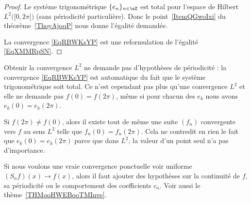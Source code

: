 \begin{proof}
    Le système trigonométrique \( \{ e_n \}_{n\in \eZ}\) est total pour l'espace de Hilbert \( L^2\big( \mathopen[ 0 , 2\pi \mathclose] \big)\) (sans périodicité particulière). Donc le point~\ref{ItemQGwoIxi} du théorème~\ref{ThoyAjoqP} nous donne l'égalité demandée.

    La convergence \eqref{EqRBWKsYP} est une reformulation de l'égalité \eqref{EqXMMRpSN}.
\end{proof}

\begin{normaltext}
    Obtenir la convergence \( L^2\) ne demande pas d'hypothèses de périodicité : la convergence \eqref{EqRBWKsYP} est automatique du fait que le système trigonométrique soit total. Ce n'est cependant pas plus qu'une convergence \( L^2\) et elle ne demande pas \( f(0)=f(2\pi)\), même si pour chacun des \( e_k\) nous avons \( e_k(0)=e_k(2\pi)\).

    Si \( f(2\pi)\neq f(0)\), alors il existe tout de même une suite \( (f_n)\) convergente vers \( f\) au sens \( L^2\) telle que \( f_n(0)=f_n(2\pi)\). Cela ne contredit en rien le fait que \( e_k(0)=e_k(2\pi)\) parce que dans \( L^2\), la valeur d'un point seul n'a pas d'importance.

    Si nous voulons une vraie convergence ponctuelle voir uniforme \( (S_nf)(x)\to f(x)\), alors il faut ajouter des hypothèses sur la continuité de \( f\), sa périodicité ou le comportement des coefficients \( c_n\). Voir aussi le thème~\ref{THMooHWEBooTMInve}.
\end{normaltext}

